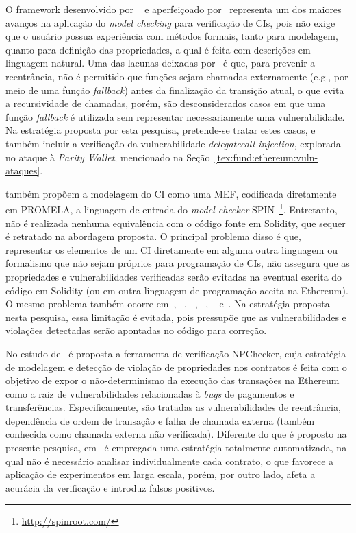 O framework desenvolvido por ~ e aperfeiçoado por~ representa um dos maiores avanços na aplicação do \textit{model checking} para verificação de CIs, pois não exige que o usuário possua experiência com métodos formais, tanto para modelagem, quanto para definição das propriedades, a qual é feita com descrições em linguagem natural. Uma das lacunas deixadas por~ é que, para prevenir a reentrância, não é permitido que funções sejam chamadas externamente (e.g., por meio de uma função \textit{fallback}) antes da finalização da transição atual, o que evita a recursividade de chamadas, porém, são desconsiderados casos em que uma função \textit{fallback} é utilizada sem representar necessariamente uma vulnerabilidade. Na estratégia proposta por esta pesquisa, pretende-se tratar estes casos, e também incluir a verificação da vulnerabilidade \textit{delegatecall injection}, explorada no ataque à \textit{Parity Wallet}, mencionado na Seção~\ref{tex:fund:ethereum:vuln-ataques}. 

 também propõem a modelagem do CI como uma MEF, codificada diretamente em PROMELA, a linguagem de entrada do \textit{model checker} SPIN~\footnote{\url{http://spinroot.com/}}. Entretanto, não é realizada nenhuma equivalência com o código fonte em Solidity, que sequer é retratado na abordagem proposta. O principal problema disso é que, representar os elementos de um CI diretamente em alguma outra linguagem ou formalismo que não sejam próprios para programação de CIs, não assegura que as propriedades e vulnerabilidades verificadas serão evitadas na eventual escrita do código em Solidity (ou em outra linguagem de programação aceita na Ethereum). O mesmo problema também ocorre em~, ~, ~, ~, ~ e~. Na estratégia proposta nesta pesquisa, essa limitação é evitada, pois pressupõe que as vulnerabilidades e violações detectadas serão apontadas no código para correção.

No estudo de~ é proposta a ferramenta de verificação NPChecker, cuja estratégia de modelagem e detecção de violação de propriedades nos contratos é feita com o objetivo de expor o não-determinismo da execução das transações na Ethereum como a raiz de vulnerabilidades relacionadas à \textit{bugs} de pagamentos e transferências. Especificamente, são tratadas as vulnerabilidades de reentrância, dependência de ordem de transação e falha de chamada externa (também conhecida como chamada externa não verificada). Diferente do que é proposto na presente pesquisa, em~ é empregada uma estratégia totalmente automatizada, na qual não é necessário analisar individualmente cada contrato, o que favorece a aplicação de experimentos em larga escala, porém, por outro lado, afeta a acurácia da verificação e introduz falsos positivos.

